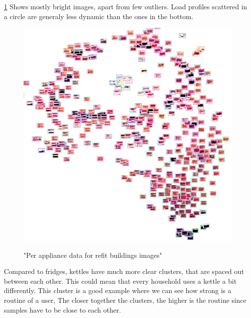 \ref{fig:tsne_pa_img_scatter_all_fridge} Shows mostly bright images, apart from few outliers.
Load profiles scattered in a circle are generaly less dynamic than the ones in the bottom.

\begin{figure}[H]
	\centering
	\caption{"Per appliance data for refit buildings images"}
	\includegraphics[width=.9\textwidth]{Figures/TSNE/TSNE_per_appliance/all/img_scatter_allfridge_freeezer_fridge freezer.png}
	\label{fig:tsne_pa_img_scatter_all_fridge}
\end{figure}


Compared to fridges, kettles have much more clear clusters, that are spaced out 
between each other. This could mean that every household uses a kettle a bit differently. 
This cluster is a good example where we can see how strong is a routine of a user,
The closer together the clusters, the higher is the routine since samples have to be 
close to each other.

